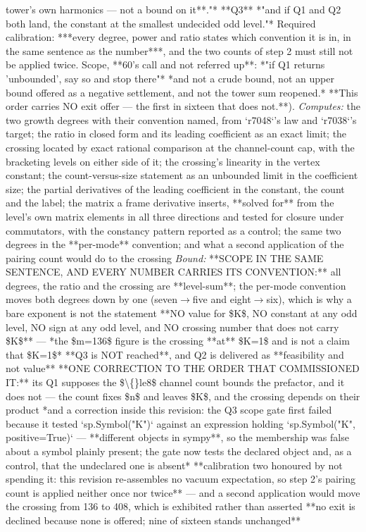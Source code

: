 \begin{description}
tower's own harmonics --- not a bound on it**."* **Q3** *"and if Q1 and Q2 both land, the constant at the smallest undecided odd level."*  Required calibration: ***every degree, power and ratio states which convention it is in, in the same sentence as the number***, and the two counts of step 2 must still not be applied twice.  Scope, **60's call and not referred up**: *"if Q1 returns 'unbounded', say so and stop there"*  *and not a crude bound, not an upper bound offered as a negative settlement, and not the tower sum reopened.*  **This order carries NO exit offer --- the first in sixteen that does not.**). 
\emph{Computes:} the two growth degrees with their convention named, from `r7048`'s law and `r7038`'s target; the ratio in closed form and its leading coefficient as an exact limit; the crossing located by exact rational comparison at the channel-count cap, with the bracketing levels on either side of it; the crossing's linearity in the vertex constant; the count-versus-size statement as an unbounded limit in the coefficient size; the partial derivatives of the leading coefficient in the constant, the count and the label; the matrix a frame derivative inserts, **solved for** from the level's own matrix elements in all three directions and tested for closure under commutators, with the constancy pattern reported as a control; the same two degrees in the **per-mode** convention; and what a second application of the pairing count would do to the crossing
 \emph{Bound:}  **SCOPE IN THE SAME SENTENCE, AND EVERY NUMBER CARRIES ITS CONVENTION:** all degrees, the ratio and the crossing are **level-sum**; the per-mode convention moves both degrees down by one (seven\ensuremath{\to}five and eight\ensuremath{\to}six), which is why a bare exponent is not the statement  **NO value for \$K\$, NO constant at any odd level, NO sign at any odd level, and NO crossing number that does not carry \$K\$** --- *the \$m=136\$ figure is the crossing **at** \$K=1\$ and is not a claim that \$K=1\$*  **Q3 is NOT reached**, and Q2 is delivered as **feasibility and not value**  **ONE CORRECTION TO THE ORDER THAT COMMISSIONED IT:** its Q1 supposes the \$\textbackslash\{\}le8\$ channel count bounds the prefactor, and it does not --- the count fixes \$n\$ and leaves \$K\$, and the crossing depends on their product  *and a correction inside this revision: the Q3 scope gate first failed because it tested `sp.Symbol("K")` against an expression holding `sp.Symbol("K", positive=True)` --- **different objects in sympy**, so the membership was false about a symbol plainly present; the gate now tests the declared object and, as a control, that the undeclared one is absent*  **calibration two honoured by not spending it: this revision re-assembles no vacuum expectation, so step 2's pairing count is applied neither once nor twice** --- and a second application would move the crossing from 136 to 408, which is exhibited rather than asserted  **no exit is declined because none is offered; nine of sixteen stands unchanged**

\end{description}
